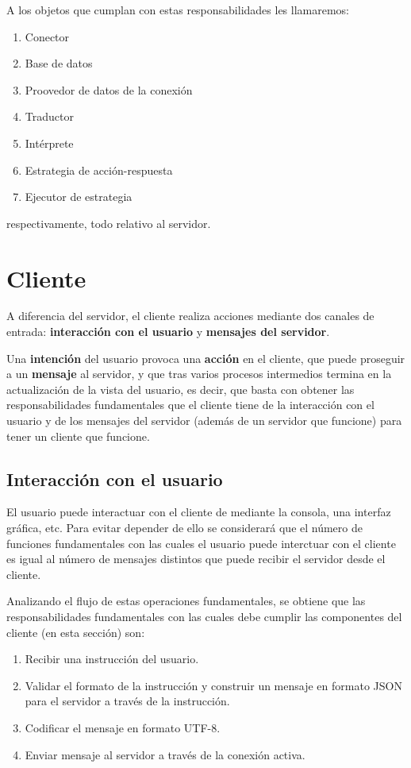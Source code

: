 A los objetos que cumplan con estas responsabilidades les llamaremos:

\begin{enumerate}
	\item Conector
	\item Base de datos
	\item Proovedor de datos de la conexión
	\item Traductor
	\item Intérprete
	\item Estrategia de acción-respuesta
	\item Ejecutor de estrategia
\end{enumerate}

respectivamente, todo relativo al servidor.

\section{Cliente}

A diferencia del servidor, el cliente realiza acciones mediante dos canales de entrada: \textbf{interacción con el usuario} y \textbf{mensajes del servidor}.

Una \textbf{intención} del usuario provoca una \textbf{acción} en el cliente, que puede proseguir a un \textbf{mensaje} al servidor, y que tras varios procesos intermedios termina en la actualización de la vista del usuario, es decir, que basta con obtener las responsabilidades fundamentales que el cliente tiene de la interacción con el usuario y de los mensajes del servidor (además de un servidor que funcione) para tener un cliente que funcione.

\subsection{Interacción con el usuario}

El usuario puede interactuar con el cliente de mediante la consola, una interfaz gráfica, etc. Para evitar depender de ello se considerará que el número de funciones fundamentales con las cuales el usuario puede interctuar con el cliente es igual al número de mensajes distintos que puede recibir el servidor desde el cliente.

Analizando el flujo de estas operaciones fundamentales, se obtiene que las responsabilidades fundamentales con las cuales debe cumplir las componentes del cliente (en esta sección) son:
\begin{enumerate}
	\item Recibir una instrucción del usuario.
	\item Validar el formato de la instrucción y construir un mensaje en formato JSON para el servidor a través de la instrucción.
	\item Codificar el mensaje en formato UTF-8.
	\item Enviar mensaje al servidor a través de la conexión activa.
\end{enumerate}

